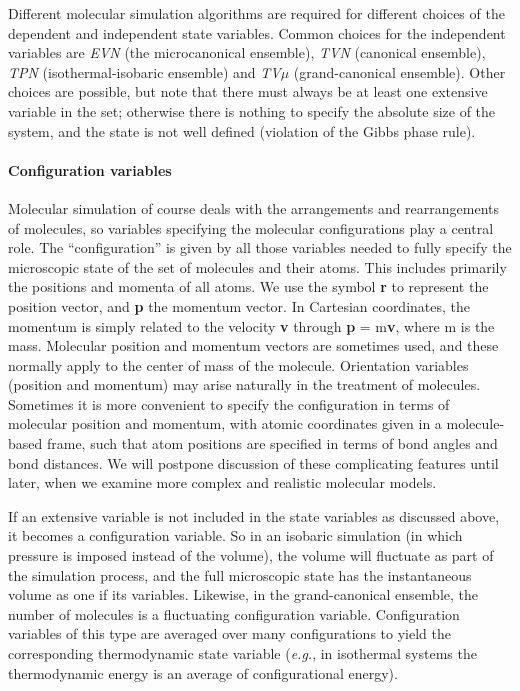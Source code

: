 \documentclass[]{article}
\let\oldparagraph\paragraph
\renewcommand{\paragraph}[1]{\oldparagraph{#1}\mbox{}}
\begin{document}
Different molecular simulation algorithms are required for different
choices of the dependent and independent state variables. Common choices
for the independent variables are \emph{EVN} (the microcanonical ensemble), \emph{TVN}
(canonical ensemble), \emph{TPN} (isothermal-isobaric ensemble) and \emph{TV$\mu$}
(grand-canonical ensemble). Other choices are possible, but note that
there must always be at least one extensive variable in the set;
otherwise there is nothing to specify the absolute size of the system,
and the state is not well defined (violation of the Gibbs phase rule).

\paragraph{Configuration variables}\label{configuration-variables}

Molecular simulation of course deals with the arrangements and
rearrangements of molecules, so variables specifying the molecular
configurations play a central role. The ``configuration'' is given by
all those variables needed to fully specify the microscopic state of the
set of molecules and their atoms. This includes primarily the positions
and momenta of all atoms. We use the symbol \textbf{r} to represent the
position vector, and \textbf{p} the momentum vector. In Cartesian
coordinates, the momentum is simply related to the velocity \textbf{v}
through \textbf{p} = m\textbf{v}, where m is the mass. Molecular
position and momentum vectors are sometimes used, and these normally
apply to the center of mass of the molecule. Orientation variables
(position and momentum) may arise naturally in the treatment of
molecules. Sometimes it is more convenient to specify the configuration
in terms of molecular position and momentum, with atomic coordinates
given in a molecule-based frame, such that atom positions are specified
in terms of bond angles and bond distances. We will postpone discussion
of these complicating features until later, when we examine more complex
and realistic molecular models.

If an extensive variable is not included in the state variables as
discussed above, it becomes a configuration variable. So in an isobaric
simulation (in which pressure is imposed instead of the volume), the
volume will fluctuate as part of the simulation process, and the full
microscopic state has the instantaneous volume as one if its variables.
Likewise, in the grand-canonical ensemble, the number of molecules is a
fluctuating configuration variable. Configuration variables of this type
are averaged over many configurations to yield the corresponding
thermodynamic state variable (\emph{e.g.}, in isothermal systems the
thermodynamic energy is an average of configurational energy).
\end{document}
